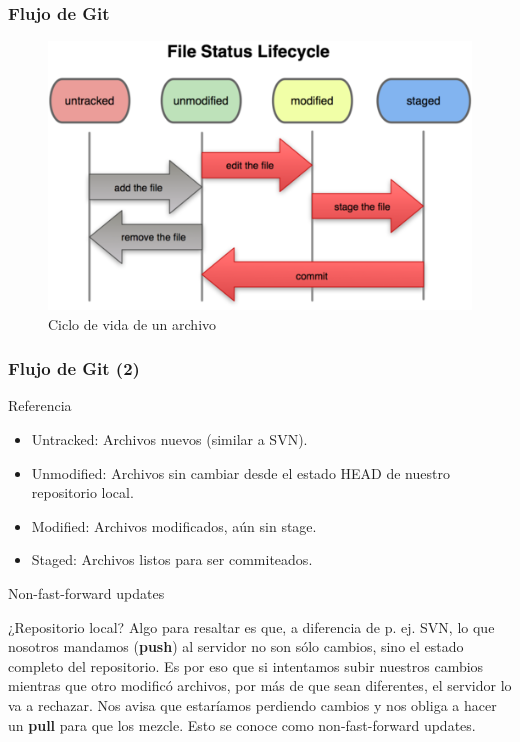 \documentclass{beamer}
\begin{document}
\begin{frame}\frametitle{Flujo de Git}
  \begin{figure}
    \includegraphics[scale=1]{flujo-git.png} 
    \caption{Ciclo de vida de un archivo}
  \end{figure}
\end{frame}

\begin{frame}\frametitle{Flujo de Git (2)}
  
  \begin{block}{Referencia}
    \begin{itemize}
    \item \alert{Untracked:} Archivos nuevos (similar a SVN). \pause
    \item \alert{Unmodified:} Archivos sin cambiar desde el estado HEAD de nuestro repositorio local. \pause
    \item \alert{Modified:} Archivos modificados, aún sin stage. \pause
    \item \alert{Staged:} Archivos listos para ser commiteados.
    \end{itemize}
  \end{block}
  
\end{frame}

\begin{frame}{Non-fast-forward updates}
  \begin{block}{¿Repositorio local? }
    Algo para resaltar es que, a diferencia de p. ej. SVN, lo que nosotros mandamos (\textbf{push}) al servidor no son sólo cambios, sino
    el estado completo del repositorio. Es por eso que si intentamos subir nuestros cambios mientras que otro modificó archivos,
    por más de que sean diferentes, el servidor lo va a rechazar. Nos avisa que estaríamos perdiendo cambios y nos obliga
    a hacer un \textbf{pull} para que los mezcle. Esto se conoce como non-fast-forward updates.
  \end{block}
\end{frame}
\end{document}
